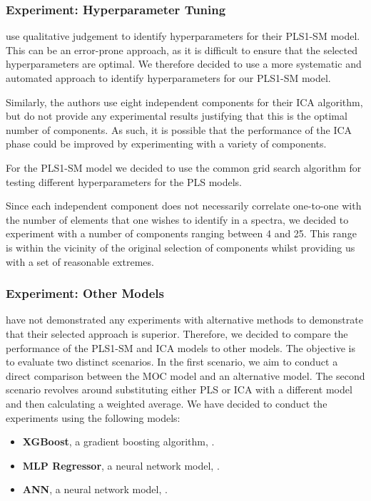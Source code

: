 \subsubsection{Experiment: Hyperparameter Tuning}\label{sec:experiment_hyperparameter_tuning}
\citet{cleggRecalibrationMarsScience2017} use qualitative judgement to identify hyperparameters for their PLS1-SM model.
This can be an error-prone approach, as it is difficult to ensure that the selected hyperparameters are optimal.
We therefore decided to use a more systematic and automated approach to identify hyperparameters for our PLS1-SM model.

Similarly, the authors use eight independent components for their ICA algorithm, but do not provide any experimental results justifying that this is the optimal number of components.
As such, it is possible that the performance of the ICA phase could be improved by experimenting with a variety of components.

For the PLS1-SM model we decided to use the common grid search algorithm for testing different hyperparameters for the PLS models.

Since each independent component does not necessarily correlate one-to-one with the number of elements that one wishes to identify in a spectra, we decided to experiment with a number of components ranging between 4 and 25.
This range is within the vicinity of the original selection of components whilst providing us with a set of reasonable extremes.


\subsubsection{Experiment: Other Models}\label{sec:experiment_other_models}
\citet{cleggRecalibrationMarsScience2017} have not demonstrated any experiments with alternative methods to demonstrate that their selected approach is superior.
Therefore, we decided to compare the performance of the PLS1-SM and ICA models to other models.
The objective is to evaluate two distinct scenarios. In the first scenario, we aim to conduct a direct comparison between the MOC model and an alternative model. The second scenario revolves around substituting either PLS or ICA with a different model and then calculating a weighted average.
We have decided to conduct the experiments using the following models:

\begin{itemize}
	\item \textbf{XGBoost}, a gradient boosting algorithm, \cite{chen_xgboost_2016}.
	\item \textbf{MLP Regressor}, a neural network model, \cite{scikit-learn}.
	\item \textbf{ANN}, a neural network model, \cite{scikit-learn}.
\end{itemize}
